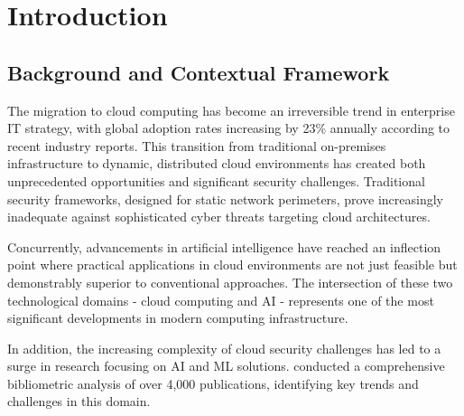 \documentclass[a4paper,12pt]{article}
\begin{document}
\newpage

\section{Introduction}
\subsection{Background and Contextual Framework}
The migration to cloud computing has become an irreversible trend in enterprise IT strategy, with global adoption rates increasing by 23\% annually according to recent industry reports. This transition from traditional on-premises infrastructure to dynamic, distributed cloud environments has created both unprecedented opportunities and significant security challenges. Traditional security frameworks, designed for static network perimeters, prove increasingly inadequate against sophisticated cyber threats targeting cloud architectures.

Concurrently, advancements in artificial intelligence have reached an inflection point where practical applications in cloud environments are not just feasible but demonstrably superior to conventional approaches. The intersection of these two technological domains - cloud computing and AI - represents one of the most significant developments in modern computing infrastructure.

In addition, the increasing complexity of cloud security challenges has led to a surge in research focusing on AI and ML solutions. \citet{alzoubi2024research} conducted a comprehensive bibliometric analysis of over 4,000 publications, identifying key trends and challenges in this domain.
\end{document}
